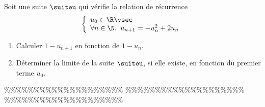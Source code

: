 



\begin{exercice} \;
Soit une suite $\suiteu$ qui v\'erifie la relation de r\'ecurrence
$$\left\lbrace\begin{array}{l}
u_0\in\R\vsec\\
\forall n\in\N,\ u_{n+1}=-u_n^2+2u_n
\end{array}\right.$$
\begin{enumerate}
 \item 
Calculer $1-u_{n+1}$ en fonction de $1-u_n$.
\item 
D\'eterminer la limite de la suite $\suiteu$, si elle existe, en fonction du premier terme $u_0$.
\end{enumerate}
\end{exercice}


\%\%\%\%\%\%\%\%\%\%\%\%\%\%\%\%\%\%\%\%
\%\%\%\%\%\%\%\%\%\%\%\%\%\%\%\%\%\%\%\%
\%\%\%\%\%\%\%\%\%\%\%\%\%\%\%\%\%\%\%\%





